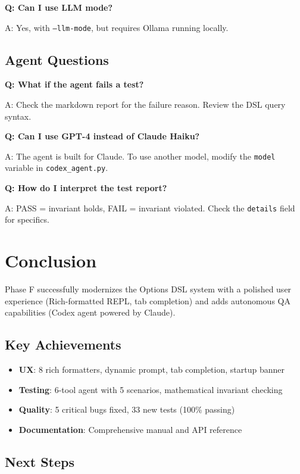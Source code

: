 \documentclass[12pt,oneside,openany]{book}
\begin{document}
\textbf{Q: Can I use LLM mode?}

A: Yes, with \texttt{--llm-mode}, but requires Ollama running locally.

\section{Agent Questions}

\textbf{Q: What if the agent fails a test?}

A: Check the markdown report for the failure reason. Review the DSL query syntax.

\textbf{Q: Can I use GPT-4 instead of Claude Haiku?}

A: The agent is built for Claude. To use another model, modify the \texttt{model} variable in \texttt{codex\_agent.py}.

\textbf{Q: How do I interpret the test report?}

A: PASS = invariant holds, FAIL = invariant violated. Check the \texttt{details} field for specifics.

\chapter{Conclusion}

Phase F successfully modernizes the Options DSL system with a polished user experience (Rich-formatted REPL, tab completion) and adds autonomous QA capabilities (Codex agent powered by Claude).

\section{Key Achievements}

\begin{itemize}
    \item \textbf{UX}: 8 rich formatters, dynamic prompt, tab completion, startup banner
    \item \textbf{Testing}: 6-tool agent with 5 scenarios, mathematical invariant checking
    \item \textbf{Quality}: 5 critical bugs fixed, 33 new tests (100\% passing)
    \item \textbf{Documentation}: Comprehensive manual and API reference
\end{itemize}

\section{Next Steps}
\end{document}
